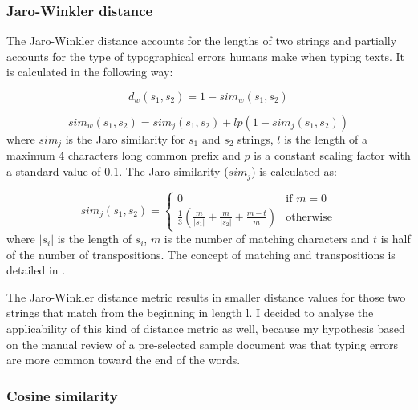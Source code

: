\subsubsection*{Jaro-Winkler distance}

The Jaro-Winkler distance \cite{piskorski2007string} accounts for the lengths of two strings and partially accounts for the type of typographical errors humans make when typing texts. It is calculated in the following way:

\begin{equation}
	d_w(s_1,s_2)=1-sim_w(s_1,s_2)
	\label{eq:winkler_d}
\end{equation}

\begin{equation}
	sim_w(s_1,s_2)=sim_j(s_1,s_2)+lp(1-sim_j(s_1,s_2))
	\label{eq:winkler_sim}
\end{equation}
where $sim_j$ is the Jaro similarity for $s_1$ and $s_2$ strings, $l$ is the length of a maximum 4 characters long common prefix and $p$ is a constant scaling factor with a standard value of $0.1$. The Jaro similarity ($sim_j$) is calculated as:

\begin{equation}
	sim_j(s_1,s_2)=
	\begin{cases}
		0                                                                            & \text{if } m=0   \\
		\frac{1}{3} \left( \frac{m}{|s_1|} + \frac{m}{|s_2|} + \frac{m-t}{m} \right) & \text{otherwise} 
	\end{cases}
	\label{eq:jaro_sim}
\end{equation}
where $|s_i|$ is the length of $s_i$, $m$ is the number of matching characters and $t$ is half of the number of transpositions. The concept of matching and transpositions is detailed in \cite{piskorski2007string}.

The Jaro-Winkler distance metric results in smaller distance values for those two strings that match from the beginning in length l. I decided to analyse the applicability of this kind of distance metric as well, because my hypothesis based on the manual review of a pre-selected sample document was that typing errors are more common toward the end of the words.

\subsubsection*{Cosine similarity}

